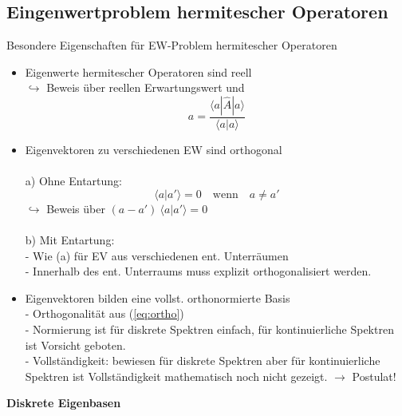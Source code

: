 \documentclass[10pt,article,colorback,accentcolor=tud9d]{scrartcl}
\begin{document}
\subsection{Eingenwertproblem hermitescher Operatoren}
Besondere Eigenschaften für EW-Problem hermitescher Operatoren
  \begin{itemize}
    \item Eigenwerte hermitescher Operatoren sind reell\\
      $\hookrightarrow$ Beweis über reellen Erwartungswert und 
      \begin{equation}
      a=\frac{\langle a|\hat{A}|a\rangle }{\langle a|a\rangle }
      \end{equation}
    \item Eigenvektoren zu verschiedenen EW sind orthogonal\\ \\
      a) Ohne Entartung:
         \begin{equation}
        \label{eq:ortho}
          \langle a|a'\rangle  = 0 \quad \text{wenn} \quad a \neq a'
          \end{equation}
          $\hookrightarrow$ Beweis über $(a-a') \ \langle a|a'\rangle  = 0$\\ \\
      b) Mit Entartung:\\
         - Wie (a) für EV aus verschiedenen ent. Unterräumen\\
         - Innerhalb des ent. Unterraums muss explizit orthogonalisiert werden.
    \item Eigenvektoren bilden eine vollst. orthonormierte Basis\\
      - Orthogonalität aus (\ref{eq:ortho})\\
      - Normierung ist für diskrete Spektren einfach, für kontinuierliche Spektren ist Vorsicht geboten.\\
      - Vollständigkeit: bewiesen für diskrete Spektren aber für kontinuierliche Spektren ist Vollständigkeit mathematisch noch nicht gezeigt. $\rightarrow$ Postulat!
  \end{itemize}
\textbf{Diskrete Eigenbasen}
\end{document}
